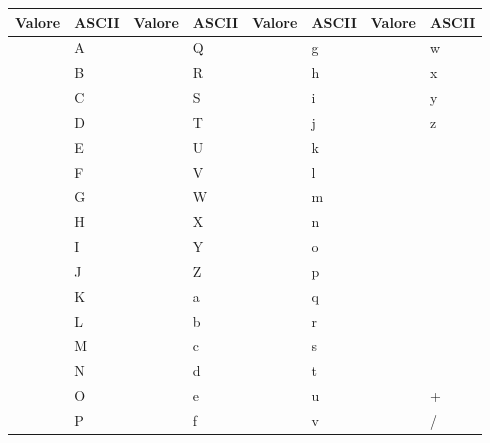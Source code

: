 \documentclass[a4paper,11pt]{article}
\begin{document}
\begin{center}
\tablehead{}
\begin{supertabular}{|m{1.925cm}|m{1.925cm}|m{1.925cm}|m{1.925cm}|m{1.925cm}|m{1.925cm}|m{1.925cm}|m{1.925cm}|}
\hline
\sffamily Valore &
\sffamily ASCII &
\sffamily Valore &
\sffamily ASCII &
\sffamily Valore &
\sffamily ASCII &
\sffamily Valore &
\sffamily ASCII\\\hline
{} &
\sffamily A &
 &
\sffamily Q &
 &
\sffamily g &
 &
\sffamily w\\\hline
{} &
\sffamily B &
 &
\sffamily R &
 &
\sffamily h &
 &
\sffamily x\\\hline
{} &
\sffamily C &
 &
\sffamily S &
 &
\sffamily i &
 &
\sffamily y\\\hline
{} &
\sffamily D &
 &
\sffamily T &
 &
\sffamily j &
 &
\sffamily z\\\hline
{} &
\sffamily E &
 &
\sffamily U &
 &
\sffamily k &
 &
\\\hline
{} &
\sffamily F &
 &
\sffamily V &
 &
\sffamily l &
 &
\\\hline
{} &
\sffamily G &
 &
\sffamily W &
 &
\sffamily m &
 &
\\\hline
{} &
\sffamily H &
 &
\sffamily X &
 &
\sffamily n &
 &
\\\hline
{} &
\sffamily I &
 &
\sffamily Y &
 &
\sffamily o &
 &
\\\hline
{} &
\sffamily J &
 &
\sffamily Z &
 &
\sffamily p &
 &
\\\hline
{} &
\sffamily K &
 &
\sffamily a &
 &
\sffamily q &
 &
\\\hline
{} &
\sffamily L &
 &
\sffamily b &
 &
\sffamily r &
 &
\\\hline
{} &
\sffamily M &
 &
\sffamily c &
 &
\sffamily s &
 &
\\\hline
{} &
\sffamily N &
 &
\sffamily d &
 &
\sffamily t &
 &
\\\hline
{} &
\sffamily O &
 &
\sffamily e &
 &
\sffamily u &
 &
\sffamily +\\\hline
{} &
\sffamily P &
 &
\sffamily f &
 &
\sffamily v &
 &
\sffamily /\\\hline
\end{supertabular}
\end{center}
\end{document}
